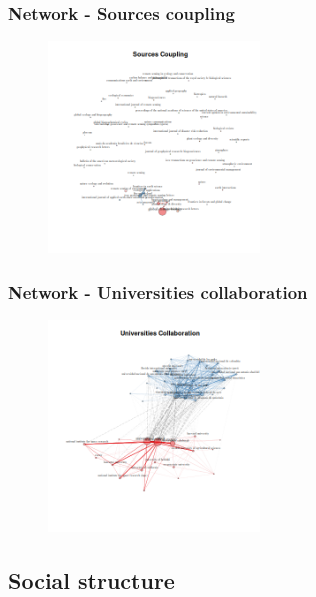 \documentclass[aspectratio=169]{beamer}
\begin{document}
\begin{frame}
	\frametitle{Network - Sources coupling}
	\begin{figure}
		\centering
		\includegraphics[width=0.5\textwidth]
		{figures/bnet_sources_coupling.png}
	\end{figure}
\end{frame}

\begin{frame}
	\frametitle{Network - Universities collaboration}
	\begin{figure}
		\centering
		\includegraphics[width=0.5\textwidth]
		{figures/bnet_universities_collaboration.png}
	\end{figure}
\end{frame}


\subsection{Social structure}


\end{document}
